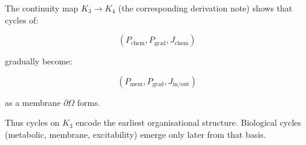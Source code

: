 The continuity map $K_3\to K_4$ (the corresponding derivation note)
shows that cycles of:

\[
  (P_{\mathrm{chem}}, P_{\mathrm{grad}}, J_{\mathrm{chem}})
\]

gradually become:

\[
  (P_{\mathrm{mem}}, P_{\mathrm{grad}}, J_{\mathrm{in/out}})
\]

as a membrane $\partial\Omega$ forms.

Thus cycles on $K_3$ encode the earliest organisational structure.
Biological cycles (metabolic, membrane, excitability) emerge only later
from that basis.
